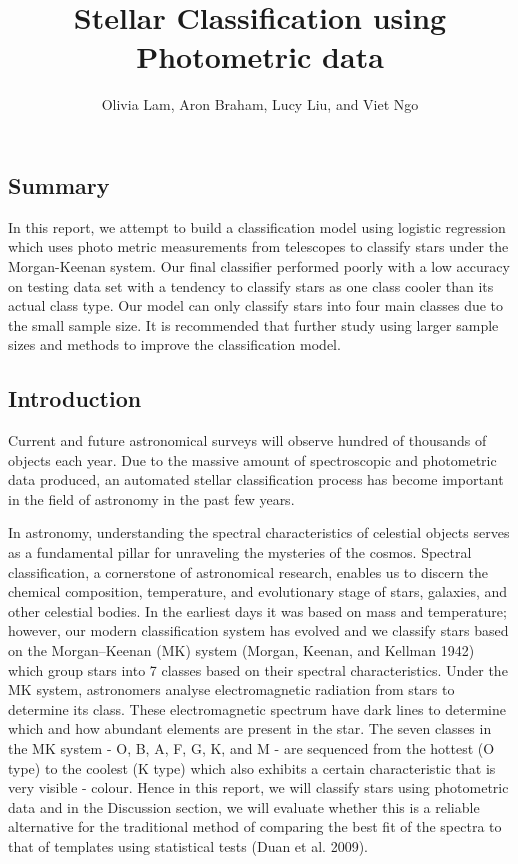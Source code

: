 \documentclass[
  letterpaper,
  DIV=11,
  numbers=noendperiod]{scrartcl}
\title{Stellar Classification using Photometric data}
\author{Olivia Lam, Aron Braham, Lucy Liu, and Viet Ngo}
\date{}
\renewcommand*\contentsname{Table of contents}
\newcommand\contentsname{Table of contents}
\begin{document}
\maketitle

\renewcommand*\contentsname{Table of contents}
{
\hypersetup{linkcolor=}
\setcounter{tocdepth}{2}
\tableofcontents
}
\subsection{Summary}\label{summary}

In this report, we attempt to build a classification model using
logistic regression which uses photo metric measurements from telescopes
to classify stars under the Morgan-Keenan system. Our final classifier
performed poorly with a low accuracy on testing data set with a tendency
to classify stars as one class cooler than its actual class type. Our
model can only classify stars into four main classes due to the small
sample size. It is recommended that further study using larger sample
sizes and methods to improve the classification model.

\subsection{Introduction}\label{introduction}

Current and future astronomical surveys will observe hundred of
thousands of objects each year. Due to the massive amount of
spectroscopic and photometric data produced, an automated stellar
classification process has become important in the field of astronomy in
the past few years.

In astronomy, understanding the spectral characteristics of celestial
objects serves as a fundamental pillar for unraveling the mysteries of
the cosmos. Spectral classification, a cornerstone of astronomical
research, enables us to discern the chemical composition, temperature,
and evolutionary stage of stars, galaxies, and other celestial bodies.
In the earliest days it was based on mass and temperature; however, our
modern classification system has evolved and we classify stars based on
the Morgan--Keenan (MK) system (Morgan, Keenan, and Kellman 1942) which
group stars into 7 classes based on their spectral characteristics.
Under the MK system, astronomers analyse electromagnetic radiation from
stars to determine its class. These electromagnetic spectrum have dark
lines to determine which and how abundant elements are present in the
star. The seven classes in the MK system - O, B, A, F, G, K, and M - are
sequenced from the hottest (O type) to the coolest (K type) which also
exhibits a certain characteristic that is very visible - colour. Hence
in this report, we will classify stars using photometric data and in the
Discussion section, we will evaluate whether this is a reliable
alternative for the traditional method of comparing the best fit of the
spectra to that of templates using statistical tests (Duan et al. 2009).
\end{document}
